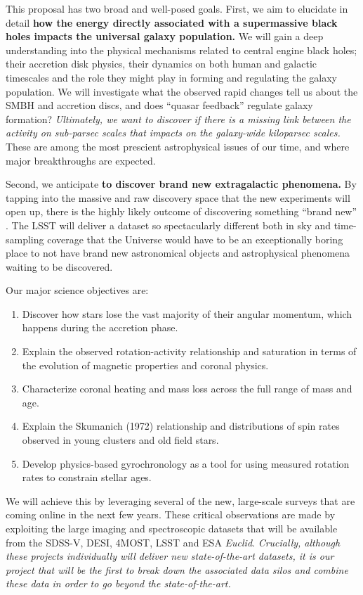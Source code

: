 \documentclass[oneside, a4paper, onecolumn, 11pt]{article}
\begin{document}
\smallskip
\smallskip
\noindent
This proposal has two broad and well-posed goals. First, we aim to elucidate in detail {\bf how the energy directly associated with a supermassive black holes impacts the universal galaxy population.}  We will gain a deep understanding into the physical mechanisms related to central engine black holes; their accretion disk physics, their dynamics on both human and galactic timescales and the role they might play in forming and regulating the galaxy population. We will investigate what the observed rapid changes tell us about the SMBH and accretion discs, and does ``quasar feedback'' regulate galaxy formation? {\it Ultimately, we want to discover if there is a missing link between the activity on sub-parsec scales that impacts on the galaxy-wide kiloparsec scales.} These are among the most prescient astrophysical issues of our time, and where major breakthroughs are expected.

\smallskip
\smallskip
\noindent
Second, we anticipate {\bf to discover brand new extragalactic phenomena.}  By tapping into the massive and raw discovery space that the new experiments will open up, there is the highly likely outcome of discovering something ``brand new''  \citep{Ivezic2008, LSST_ScienceBook}. The LSST will deliver a dataset so spectacularly different both in sky and time-sampling coverage that the Universe would have to be an exceptionally boring place to not have brand new astronomical objects and astrophysical phenomena waiting to be discovered.

\smallskip
\smallskip
\noindent
Our major science objectives are:
\begin{enumerate}
\item Discover how stars lose the vast majority of their angular momentum, which happens during the accretion phase.
\item Explain the observed rotation-activity relationship and saturation in terms of the evolution of magnetic properties and coronal physics.
\item Characterize coronal heating and mass loss across the full range of mass and age.
\item Explain the Skumanich (1972) relationship and distributions of spin rates observed in young clusters and old field stars.
\item Develop physics-based gyrochronology as a tool for using measured rotation rates to constrain stellar ages.
\end{enumerate}


\smallskip
\smallskip
\noindent
We will achieve this by leveraging several of the new, large-scale surveys that are coming online in the next few years. These critical observations are made by exploiting the large imaging and spectroscopic datasets that will be available from the SDSS-V, DESI, 4MOST, LSST and ESA {\it Euclid}. {\it Crucially, although these  projects individually will deliver new state-of-the-art datasets, it is our project that will be the first to break down the associated data  silos and combine these data in order to go beyond the state-of-the-art.}
\end{document}
